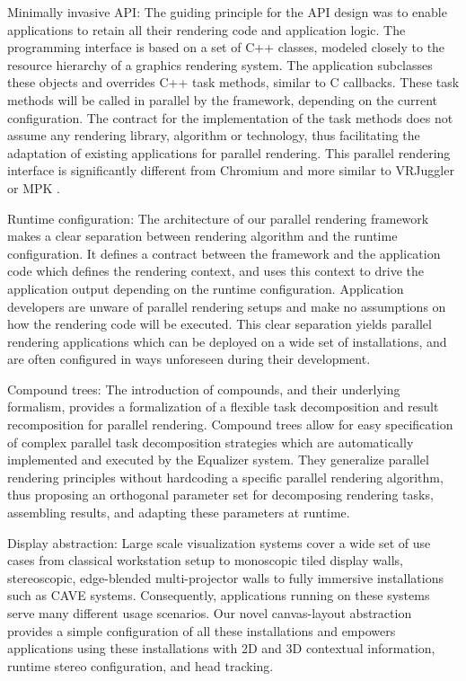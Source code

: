 \begin{compactdesc}

\item[Minimally invasive API:] The guiding principle for the API design was
to enable applications to retain all their rendering code and application logic.
The programming interface is based on a set of C++ classes, modeled closely to
the resource hierarchy of a graphics rendering system. The application
subclasses these objects and overrides C++ task methods, similar to C callbacks.
These task methods will be called in parallel by the framework, depending on the
current configuration. The contract for the  implementation of the task methods
does not assume any rendering library, algorithm or technology, thus
facilitating the adaptation of existing applications for parallel rendering.
This parallel rendering interface is significantly different from Chromium
\cite{HHNFAKK:02} and more similar to VRJuggler \cite{BJHMBC:01} or MPK
\cite{BRE:05}.

\item[Runtime configuration:] The architecture of our parallel rendering
framework makes a clear separation between rendering algorithm and the runtime
configuration. It defines a contract between the framework and the application
code which defines the rendering context, and uses this context to drive the
application output depending on the runtime configuration. Application
developers are unware of parallel rendering setups and make no assumptions on
how the rendering code will be executed. This clear separation yields parallel
rendering applications which can be deployed on a wide set of installations, and
are often configured in ways unforeseen during their development.

\item[Compound trees:] The introduction of compounds, and their underlying
formalism, provides a formalization of a flexible task decomposition and result
recomposition for parallel rendering. Compound trees allow for easy specification
of complex parallel task decomposition strategies which are automatically
implemented and executed by the Equalizer system. They generalize parallel
rendering principles without hardcoding a specific parallel rendering algorithm,
thus proposing an orthogonal parameter set for decomposing rendering tasks,
assembling results, and adapting these parameters at runtime.

\item[Display abstraction:] Large scale visualization systems cover a wide set
of use cases from classical workstation setup to monoscopic tiled display
walls, stereoscopic, edge-blended multi-projector walls to fully immersive
installations such as CAVE systems. Consequently, applications running on these
systems serve many different usage scenarios. Our novel canvas-layout
abstraction provides a simple configuration of all these installations and
empowers applications using these installations with 2D and 3D contextual
information, runtime stereo configuration, and head tracking.


\end{compactdesc}
